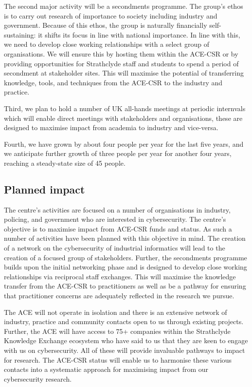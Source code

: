 \documentclass[11pt]{article}
\begin{document}
    The second major activity will be a secondments programme.  The
    group's ethos is to carry out research of importance to society
    including industry and government. Because of this ethos, the
    group is naturally financially self-sustaining: it shifts its
    focus in line with national importance. In line with this, we need to develop close working relationships with a select group of organisations. We will ensure this by hosting them within the ACE-CSR or by providing opportunities for Strathclyde staff and students to spend a period of secondment at stakeholder sites. This will maximise the potential of transferring knowledge, tools, and techniques from the ACE-CSR to the industry and practice.

    Third, we plan to hold a number of UK all-hands meetings at
    periodic internvals which will enable direct meetings with
    stakeholders and organisations, these are designed to maximise
    impact from academia to industry and vice-versa.

    Fourth, we have grown by about four people per year for the last
    five years, and we anticipate further growth of three people per
    year for another four years, reaching a steady-state size of 45
    people.

    
    \subsection{Planned impact}
    
The centre's activities are focused on a number of organisations in industry, policing, and government who are interested in cybersecurity. The centre's objective is to maximise impact from ACE-CSR funds and status. As such a number of activities have been planned with this objective in mind. The creation of a network on the cybersecurity of industrial informatics will lead to the creation of a focused group of  stakeholders. Further, the secondments programme  builds upon the initial networking phase and is designed to develop close working relationships  via reciprocal staff exchanges. This will maximise the knowledge transfer from the ACE-CSR to practitioners as well as be a pathway for ensuring that practitioner concerns are adequately reflected in the research we pursue.

The ACE will not operate in isolation and there is an extensive network of industry, practice and community contacts open to us through existing projects. Further, the ACE will have access to 75+ companies within the Strathclyde Knowledge Exchange ecosystem who have said to us that they are keen to engage with us on cybersecurity.  All of these will provide invaluable pathways to impact for research. The ACE-CSR status will enable us to harmonise these various contacts into a systematic approach for maximising impact from our cybersecurity research. 
\end{document}

